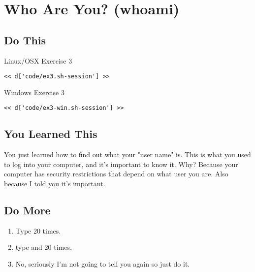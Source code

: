 \chapter{Who Are You? (whoami)}

\section{Do This}

\begin{code}{Linux/OSX Exercise 3}
\begin{Verbatim}
<< d['code/ex3.sh-session'] >>
\end{Verbatim}
\end{code}

\begin{code}{Windows Exercise 3}
\begin{Verbatim}
<< d['code/ex3-win.sh-session'] >>
\end{Verbatim}
\end{code}

\section{You Learned This}

You just learned how to find out what your "user name" is.  This is what
you used to log into your computer, and it's important to know it.  Why?
Because your computer has security restrictions that depend on what user
you are.  Also because I told you it's important.

\section{Do More}

\begin{enumerate}
\item Type  20 times.
\item type  and  20 times.
\item No, seriously I'm not going to tell you again so just do it.
\end{enumerate}

